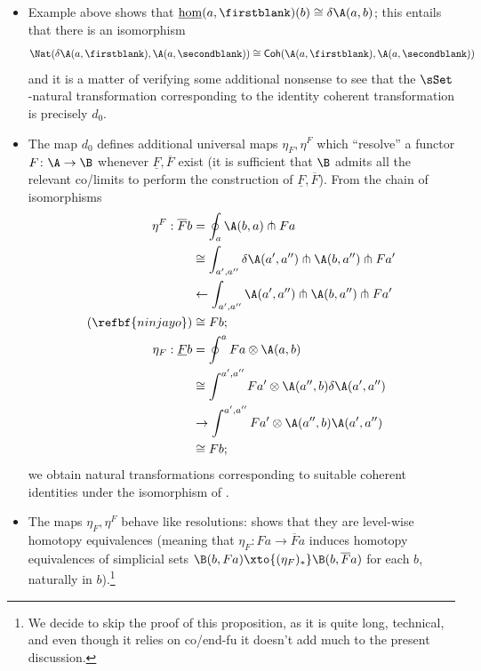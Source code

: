 \begin{itemize}
\item Example  above shows that $\underline{\hom}(a,\firstblank)(b)\cong \delta \A(a,b)$; this entails that there is an isomorphism
\[\label{dizzero}
\Nat(\delta \A(a,\firstblank), \A(a, \secondblank)) \cong
\textsf{Coh}(\A(a,\firstblank),\A(a,\secondblank))
\]
and it is a matter of verifying some additional nonsense to see that the $\sSet$-natural transformation corresponding to the identity coherent transformation is precisely $d_0$.
\item The map $d_0$ defines additional universal maps $\eta_F , \eta^F$ which ``resolve'' a functor $F \colon \A \to \B$ whenever $\underline{F}, \overline{F}$ exist (it is sufficient that $\B$ admits all the relevant co/limits to perform the construction of $\underline{F}, \overline{F}$). From the chain of isomorphisms
\begin{align*}
\eta^F : \overline{F}b & = \oint_a \A(b,a)\pitchfork Fa\\
&\cong \int_{a',a''} \delta\A(a',a'')\pitchfork\A(b,a'')\pitchfork Fa'\\
&\leftarrow \int_{a',a''} \A(a',a'')\pitchfork\A(b,a'')\pitchfork Fa'\\
(\refbf{ninjayo}) &\cong Fb;\\
\eta_F : \underline{F}b &= \oint^a Fa \otimes \A(a,b)\\
&\cong \int^{a',a''} Fa' \otimes \A(a'',b)\delta\A(a',a'')\\
&\to \int^{a',a''} Fa' \otimes \A(a'',b)\A(a',a'')\\
&\cong Fb;
\end{align*}
we obtain  natural transformations corresponding to suitable coherent identities under the isomorphism of \aprop{}.
\item The maps $\eta_F , \eta^F$ behave like resolutions: \cite[\aprop\textbf{3.4}]{cordier1997homotopy} shows that they are level-wise homotopy equivalences (meaning that $\eta_F \colon Fa \to \overline{F}a$ induces homotopy equivalences of simplicial sets $\B(b, Fa)\xto{(\eta_F)_*} \B(b, \overline{F}a)$ for each $b$, naturally in $b$).\footnote{We decide to skip the proof of this proposition, as it is quite long, technical, and even though it relies on co/end-fu it doesn't add much to the present discussion.}
\end{itemize}
